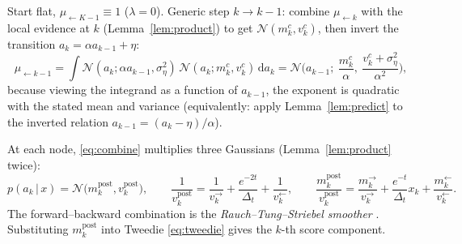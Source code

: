\documentclass[11pt]{article}
\theoremstyle{definition}
\newcommand{\N}{\mathcal{N}}
\newcommand{\Dt}{\Delta_t}
\newcommand{\given}{\,|\,}
\newcommand{\dd}{\mathrm{d}}
\begin{document}
\begin{derivation}
Start flat, $\mu_{\leftarrow K-1}\equiv1$ ($\lambda=0$). Generic step
$k\to k-1$: combine $\mu_{\leftarrow k}$ with the local evidence at $k$
(Lemma~\ref{lem:product}) to get $\N(m^c_k,v^c_k)$, then invert the transition
$a_k=\alpha a_{k-1}+\eta$:
\[
  \mu_{\leftarrow k-1}
  =\int\N(a_k;\alpha a_{k-1},\sigma_\eta^2)\,\N(a_k;m^c_k,v^c_k)\,\dd a_k
  =\N\!\Big(a_{k-1};\ \frac{m^c_k}{\alpha},\
   \frac{v^c_k+\sigma_\eta^2}{\alpha^2}\Big),
\]
because viewing the integrand as a function of $a_{k-1}$, the exponent is
quadratic with the stated mean and variance (equivalently: apply
Lemma~\ref{lem:predict} to the inverted relation
$a_{k-1}=(a_k-\eta)/\alpha$).
\end{derivation}

\begin{derivation}[: combination $=$ RTS smoother]
At each node, \eqref{eq:combine} multiplies three Gaussians
(Lemma~\ref{lem:product} twice):
\[
  p(a_k\given x)=\N\!\big(m^{\mathrm{post}}_k,v^{\mathrm{post}}_k\big),\qquad
  \frac1{v^{\mathrm{post}}_k}=\frac1{v^{\to}_k}+\frac{e^{-2t}}{\Dt}
  +\frac1{v^{\leftarrow}_k},\qquad
  \frac{m^{\mathrm{post}}_k}{v^{\mathrm{post}}_k}
  =\frac{m^{\to}_k}{v^{\to}_k}+\frac{e^{-t}}{\Dt}x_k
  +\frac{m^{\leftarrow}_k}{v^{\leftarrow}_k}.
\]
The forward--backward combination is the \emph{Rauch--Tung--Striebel
smoother} \citep{rauchtungstriebel1965}. Substituting
$m^{\mathrm{post}}_k$ into Tweedie \eqref{eq:tweedie} gives the $k$-th score
component.
\end{derivation}
\end{document}
